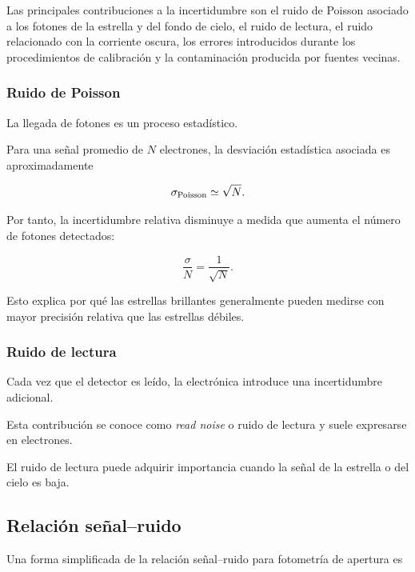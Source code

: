 \documentclass[12pt,letterpaper,oneside]{book}
\begin{document}
Las principales contribuciones a la incertidumbre son el ruido de Poisson asociado a los fotones de la estrella y del fondo de cielo, el ruido de lectura, el ruido relacionado con la corriente oscura, los errores introducidos durante los procedimientos de calibración y la contaminación producida por fuentes vecinas.


\subsubsection{Ruido de Poisson}

La llegada de fotones es un proceso estadístico.

Para una señal promedio de $N$ electrones, la desviación estadística asociada es aproximadamente

\[
\sigma_{\rm Poisson}
\simeq
\sqrt{N}.
\]

Por tanto, la incertidumbre relativa disminuye a medida que aumenta el número de fotones detectados:

\[
\frac{\sigma}{N}
=
\frac{1}{\sqrt{N}}.
\]

Esto explica por qué las estrellas brillantes generalmente pueden medirse con mayor precisión relativa que las estrellas débiles.


\subsubsection{Ruido de lectura}

Cada vez que el detector es leído, la electrónica introduce una incertidumbre adicional.

Esta contribución se conoce como \textit{read noise} o ruido de lectura y suele expresarse en electrones.

El ruido de lectura puede adquirir importancia cuando la señal de la estrella o del cielo es baja.



\subsection{Relación señal--ruido}

Una forma simplificada de la relación señal--ruido para fotometría de apertura es
\end{document}
